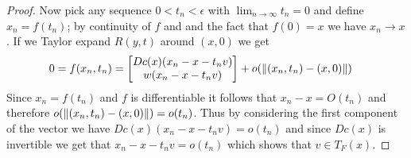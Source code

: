 \begin{proof}
Now pick any sequence $0 < t_n < \epsilon$ with $\lim_{n \to \infty} t_n = 0$ and define $x_n = f(t_n)$; by continuity of $f$ and and the 
fact that $f(0) = x$ we have $x_n \to x$.  If we Taylor expand $R(y,t)$ around $(x,0)$ we get
\begin{align*}
0 &= f(x_n, t_n) = \begin{bmatrix}
Dc(x) (x_n - x - t_n v) \\
w(x_n - x - t_n v)
\end{bmatrix}
+ o(\left \lVert (x_n,t_n) - (x,0) \right \rVert)
\end{align*}
Since $x_n = f(t_n)$ and $f$ is differentiable it follows that $x_n - x = O(t_n)$ and therefore $o(\left \lVert (x_n,t_n) - (x,0) \right \rVert) = o(t_n)$.  Thus by
considering the first component of the vector we have $Dc(x)  (x_n - x - t_n v)  = o(t_n)$ and since 
$Dc(x)$ is invertible we get that $x_n - x -t_n v = o(t_n)$ which shows that $v \in T_F(x)$.
\end{proof}

